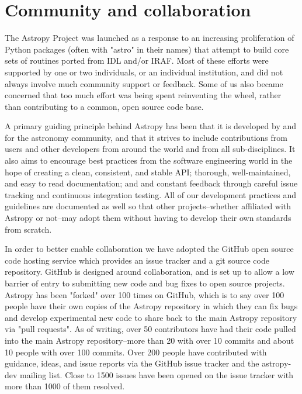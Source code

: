 \documentclass[11pt,twoside]{article}
\begin{document}
\section{Community and collaboration}

The Astropy Project was launched as a response to an increasing proliferation
of Python packages (often with "astro" in their names) that attempt to build
core sets of routines ported from IDL and/or IRAF.  Most of these efforts were
supported by one or two individuals, or an individual institution, and did not
always involve much community support or feedback.  Some of us also became
concerned that too much effort was being spent reinventing the wheel, rather
than contributing to a common, open source code base.

A primary guiding principle behind Astropy has been that it is developed by
and for the astronomy community, and that it strives to include contributions
from users and other developers from around the world and from all
sub-disciplines.  It also aims to encourage best practices from the software
engineering world in the hope of creating a clean, consistent, and stable API;
thorough, well-maintained, and easy to read documentation; and and constant
feedback through careful issue tracking and continuous integration testing.
All of our development practices and guidelines are documented as well so that
other projects--whether affiliated with Astropy or not--may adopt them without
having to develop their own standards from scratch.

In order to better enable collaboration we have adopted the GitHub open source
code hosting service which provides an issue tracker and a git source code
repository.  GitHub is designed around collaboration, and is set up to allow a
low barrier of entry to submitting new code and bug fixes to open source
projects.  Astropy has been "forked" over 100 times on GitHub, which is to say
over 100 people have their own copies of the Astropy repository in which they
can fix bugs and develop experimental new code to share back to the main
Astropy repository via "pull requests".  As of writing, over 50 contributors
have had their code pulled into the main Astropy repository--more than 20 with
over 10 commits and about 10 people with over 100 commits.  Over 200 people
have contributed with guidance, ideas, and issue reports via the GitHub issue
tracker and the astropy-dev mailing list.  Close to 1500 issues have been
opened on the issue tracker with more than 1000 of them resolved.
\end{document}
